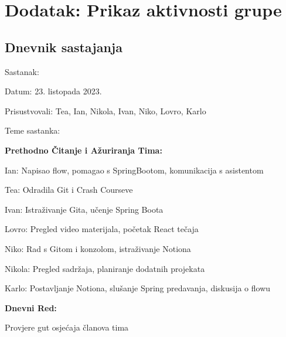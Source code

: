 \chapter*{Dodatak: Prikaz aktivnosti grupe}
		
		\section*{Dnevnik sastajanja}
				
		\begin{packed_enum}
        \item Sastanak: 
            \item[] \begin{packed_item}
                \item Datum: 23. listopada 2023.
                \item Prisustvovali: Tea, Ian, Nikola, Ivan, Niko, Lovro, Karlo
                \item Teme sastanka:
                    \begin{packed_item}
                        \item \textbf{Prethodno Čitanje i Ažuriranja Tima:}
                            \begin{packed_item}
                                \item Ian: Napisao flow, pomagao s SpringBootom, komunikacija s asistentom
                                \item Tea: Odradila Git i Crash Courseve
                                \item Ivan: Istraživanje Gita, učenje Spring Boota
                                \item Lovro: Pregled video materijala, početak React tečaja
                                \item Niko: Rad s Gitom i konzolom, istraživanje Notiona
                                \item Nikola: Pregled sadržaja, planiranje dodatnih projekata
                                \item Karlo: Postavljanje Notiona, slušanje Spring predavanja, diskusija o flowu
                            \end{packed_item}
                        \item \textbf{Dnevni Red:}
                            \begin{packed_item}
                                \item Provjere gut osjećaja članova tima

\end{packed_item}
\end{packed_item}
\end{packed_item}
\end{packed_enum}
